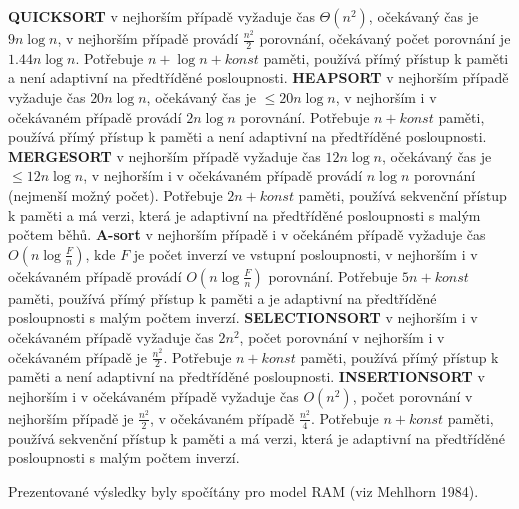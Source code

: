 \documentclass[a4paper,12pt]{article}
\begin{document}
{\bf QUICKSORT} v nejhorším případě vyžaduje čas 
$\Theta (n^2)$, oče\-kávaný čas je $9n\log n$, v 
nej\-horším případě provádí $\frac {n^2}2$ porov\-nání,  
očekávaný počet porov\-nání je $1.44n\log n$. 
Potřebuje $n+\log n+konst$ paměti, používá přímý 
přístup k paměti a není adaptivní na předtříděné 
posloupnosti.\newline 
{\bf HEAPSORT} v nejhorším případě vyžaduje čas $
20n\log n$, 
oče\-kávaný čas je $\le 20n\log n$, v nejhorším i v 
očekávaném případě provádí $2n\log n$ porovnání. 
Potřebuje $n+konst$ paměti, používá přímý přístup k paměti a 
není adaptivní na předtříděné posloupnosti.\newline 
{\bf MERGESORT} v nejhorším případě vyžaduje čas 
$12n\log n$, očekávaný čas je $\le 12n\log n$, v nejhorším 
i v očekáva\-ném případě provádí $n\log n$ 
porovnání (nejmenší možný počet). Potřebuje $
2n+konst$ 
paměti, používá 
sekvenční přístup k paměti a má verzi, která je 
adaptivní na předtříděné posloupnosti s malým počtem 
běhů.\newline 
{\bf A-sort} v nejhorším případě i v očekáném případě vyžaduje čas 
$O(n\log\frac Fn)$, kde $F$ je počet inverzí ve vstupní 
posloupnosti,  v nejhorším i v očekávaném 
případě provádí $O(n\log\frac Fn)$ porovnání. Potřebuje  
$5n+konst$ paměti, používá přímý přístup k paměti 
a je adaptivní na předtříděné posloupnosti s malým 
počtem inverzí.\newline 
{\bf SELECTIONSORT} v nejhorším i v očekávaném případě 
vyžaduje čas $2n^2$, počet porov\-nání v nejhorším 
i v očekávaném případě je $\frac {n^2}2$. Potřebuje 
$n+konst$ paměti, používá přímý přístup k paměti a 
není adaptivní na předtříděné posloupnosti.\newline 
{\bf INSERTIONSORT} v nejhorším i v očekávaném případě  
vy\-žaduje čas $O(n^2)$, počet porov\-nání v nejhorším 
případě je $\frac {n^2}2$, v oče\-ká\-vaném případě 
$\frac {n^2}4$. Potřebuje $n+konst$ paměti, použí\-vá 
sekvenční přístup k paměti a má verzi, která je 
adaptivní na předtříděné posloupnosti s malým počtem 
inverzí.

Prezentované  výsledky byly spočítány 
pro model RAM (viz Mehlhorn 1984).
\end{document}
